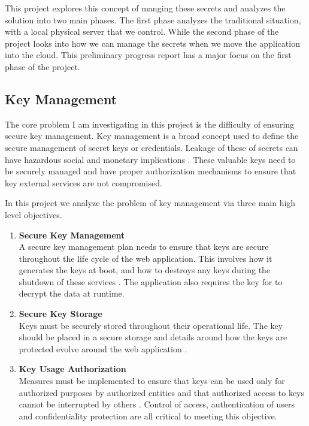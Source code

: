 \documentclass[11pt, a4paper, notitlepage]{article}
\begin{document}
This project explores this concept of manging these secrets and analyzes the solution into two main phases. The first phase analyzes the traditional situation, with a local physical server that we control. While the second phase of the project looks into how we can manage the secrets when we move the application into the cloud. This preliminary progress report has a major focus on the first phase of the project. 

\subsection*{Key Management}
The core problem I am investigating in this project is the difficulty of ensuring secure key management. Key management is a broad concept used to define the secure management of secret keys or credentials. Leakage of these of secrets can have hazardous social and monetary implications \cite{huang2003web}. These valuable keys need to be securely managed and have proper authorization mechanisms to ensure that key external services are not compromised. 

In this project we analyze the problem of key management via three main high level objectives.

\begin{enumerate}
\item \textbf{Secure Key Management} \\
A secure key management plan needs to ensure that keys are secure throughout the life cycle of the web application. This involves how it generates the keys at boot, and how to destroys any keys during the shutdown of these services \cite{entrprise-guide}. The application also requires the key for to decrypt the data at runtime. 

\item \textbf{Secure Key Storage} \\
Keys must be securely stored throughout their operational life. The key should be placed in a secure storage and details around how the keys are protected evolve around the web application  \cite{entrprise-guide}. 

\item \textbf{Key Usage Authorization} \\
Measures must be implemented to ensure that keys can be used only for authorized  purposes by authorized entities and that authorized access to keys cannot be interrupted by others  \cite{entrprise-guide}. Control of access, authentication of users and confidentiality protection are all critical to meeting this objective.
\end{enumerate}
\end{document}
